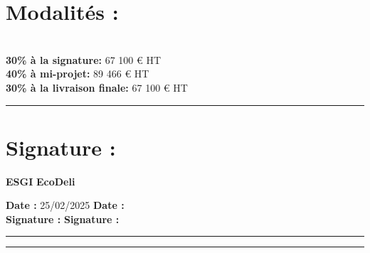 \documentclass{report}
\begin{document}
\section*{Modalités :} \\
\noindent \textbf{30\% à la signature:} 67 100 € HT \\
\noindent \textbf{40\% à mi-projet:} 89 466 € HT \\
\noindent \textbf{30\% à la livraison finale:} 67 100 € HT \\

\noindent\rule{\linewidth}{0.4pt}

\section*{Signature :} 
\vspace{1cm} 

\noindent \textbf{ESGI} \hspace{8cm} \textbf{EcoDeli} 
\vspace{0.5cm}

\noindent \textbf{Date :} 25/02/2025 \hspace{6cm} \textbf{Date :} \\

\noindent \textbf{Signature :} \hspace{7cm} \textbf{Signature :} \\

\vspace{1cm} 
\noindent \rule[0mm]{7cm}{0.4pt} \hspace{2cm} \noindent \rule[0mm]{7cm}{0.4pt} \\[0.5cm]
\end{document}
